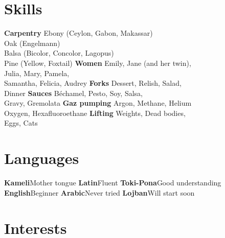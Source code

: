 ﻿\documentclass{fullercv}
\begin{document}
\section{Skills}
\cvdoubleitem
{\textbf{Carpentry}}{
    Ebony {\scriptsize (Ceylon, Gabon, Makassar)}\\
    Oak {\scriptsize (Engelmann)}\\
    Balsa {\scriptsize (Bicolor, Concolor, Lagopus)}\\
    Pine {\scriptsize (Yellow, Foxtail)}
}
{\textbf{Women}}{
    Emily, Jane {\scriptsize (and her twin)},\\
    Julia, Mary, Pamela,\\
    Samantha, Felicia, Audrey
}
\cvdoubleitem
{\textbf{Forks}}{
    Dessert, Relish, Salad,\\
    Dinner
}
{\textbf{Sauces}}{
    Béchamel, Pesto, Soy, Salsa,\\
    Gravy, Gremolata
}
\cvdoubleitem
{\textbf{Gaz pumping}}{
    Argon, Methane, Helium\\
    Oxygen, Hexafluoroethane
}
{\textbf{Lifting}}{
    Weights, Dead bodies,\\
    Eggs, Cats
}

\section{Languages}
\cvdoubleitem
{\textbf{Kameli}}{Mother tongue}
{\textbf{Latin}}{Fluent}
\cvdoubleitem
{\textbf{Toki-Pona}}{Good understanding}
{\textbf{English}}{Beginner}
\cvdoubleitem
{\textbf{Arabic}}{Never tried}
{\textbf{Lojban}}{Will start soon}

\section{Interests}
\end{document}
